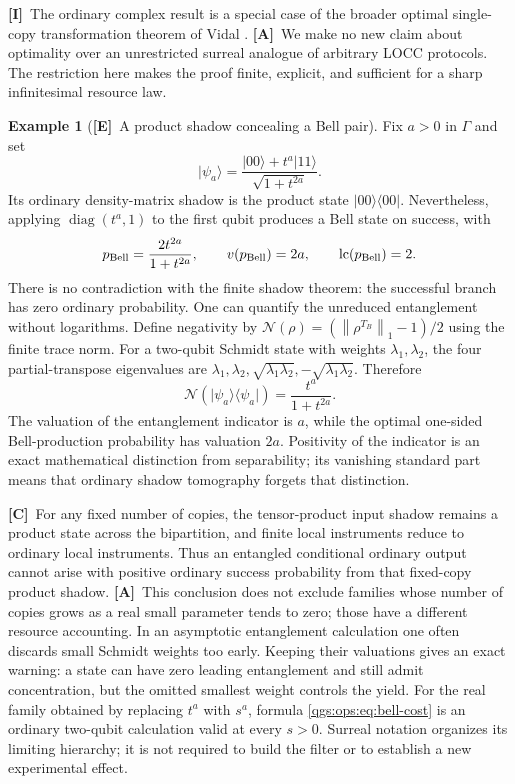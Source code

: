 \documentclass[11pt,oneside]{article}
\numberwithin{equation}{section}
\theoremstyle{plain}
\theoremstyle{definition}
\newtheorem{example}[example]{Example}
\theoremstyle{remark}
\DeclareMathOperator{\diag}{diag}
\DeclareMathOperator{\lc}{lc}
\newcommand{\norm}[1]{\left\|#1\right\|}
\newcommand{\ket}[1]{\lvert#1\rangle}
\newcommand{\bra}[1]{\langle#1\rvert}
\newcommand{\proj}[1]{\ket{#1}\!\bra{#1}}
\newcommand{\TE}{\textcolor{TierE}{\textsf{\bfseries[E]}}}
\newcommand{\TC}{\textcolor{TierC}{\textsf{\bfseries[C]}}}
\newcommand{\TA}{\textcolor{TierA}{\textsf{\bfseries[A]}}}
\newcommand{\TI}{\textcolor{TierI}{\textsf{\bfseries[I]}}}
\begin{document}
\TI\ The ordinary complex result is a special case of the broader optimal single-copy transformation theorem of Vidal \cite{Vidal}. \TA\ We make no new claim about optimality over an unrestricted surreal analogue of arbitrary LOCC protocols. The restriction here makes the proof finite, explicit, and sufficient for a sharp infinitesimal resource law.

\begin{example}[\TE\ A product shadow concealing a Bell pair]\label{qgs:ops:ex:bell}
Fix $a>0$ in $\Gamma$ and set
\begin{equation}\label{qgs:ops:eq:tiny-entanglement}
 \ket{\psi_a}=\frac{\ket{00}+t^a\ket{11}}{\sqrt{1+t^{2a}}}.
\end{equation}
Its ordinary density-matrix shadow is the product state $\proj{00}$. Nevertheless, applying $\diag(t^a,1)$ to the first qubit produces a Bell state on success, with
\begin{equation}\label{qgs:ops:eq:bell-cost}
 p_{\rm Bell}=\frac{2t^{2a}}{1+t^{2a}},\qquad
 v(p_{\rm Bell})=2a,\qquad \lc(p_{\rm Bell})=2.
\end{equation}
There is no contradiction with the finite shadow theorem: the successful branch has zero ordinary probability. One can quantify the unreduced entanglement without logarithms. Define negativity by $\mathcal N(\rho)=(\norm{\rho^{T_B}}_1-1)/2$ using the finite trace norm. For a two-qubit Schmidt state with weights $\lambda_1,\lambda_2$, the four partial-transpose eigenvalues are $\lambda_1,\lambda_2,\sqrt{\lambda_1\lambda_2},-\sqrt{\lambda_1\lambda_2}$. Therefore
\begin{equation}\label{qgs:ops:eq:negativity}
 \mathcal N(\proj{\psi_a})=\frac{t^a}{1+t^{2a}}.
\end{equation}
The valuation of the entanglement indicator is $a$, while the optimal one-sided Bell-production probability has valuation $2a$. Positivity of the indicator is an exact mathematical distinction from separability; its vanishing standard part means that ordinary shadow tomography forgets that distinction.
\end{example}

\TC\ For any fixed number of copies, the tensor-product input shadow remains a product state across the bipartition, and finite local instruments reduce to ordinary local instruments. Thus an entangled conditional ordinary output cannot arise with positive ordinary success probability from that fixed-copy product shadow. \TA\ This conclusion does not exclude families whose number of copies grows as a real small parameter tends to zero; those have a different resource accounting. In an asymptotic entanglement calculation one often discards small Schmidt weights too early. Keeping their valuations gives an exact warning: a state can have zero leading entanglement and still admit concentration, but the omitted smallest weight controls the yield. For the real family obtained by replacing $t^a$ with $s^a$, formula \eqref{qgs:ops:eq:bell-cost} is an ordinary two-qubit calculation valid at every $s>0$. Surreal notation organizes its limiting hierarchy; it is not required to build the filter or to establish a new experimental effect.
\end{document}
